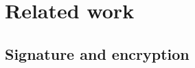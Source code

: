 \documentclass[11pt, a4paper]{article}
\begin{document}



\section{Related work}

    \subsection{Signature and encryption}
\end{document}

